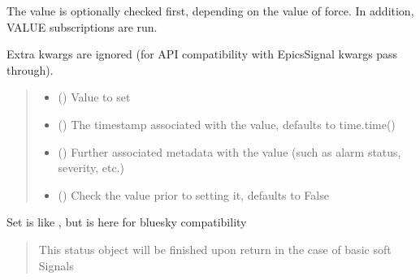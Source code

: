 \documentclass[letterpaper,10pt,english]{sphinxmanual}
\begin{document}
\begin{fulllineitems}
\begin{fulllineitems}
\sphinxAtStartPar
The value is optionally checked first, depending on the value of force.
In addition, VALUE subscriptions are run.

\sphinxAtStartPar
Extra kwargs are ignored (for API compatibility with EpicsSignal kwargs
pass through).
\begin{quote}\begin{description}
\begin{itemize}
\item {} 
\sphinxAtStartPar
{} () \textendash{} Value to set

\item {} 
\sphinxAtStartPar
{} (\sphinxstyleliteralemphasis{\sphinxupquote{, }}) \textendash{} The timestamp associated with the value, defaults to time.time()

\item {} 
\sphinxAtStartPar
{} (\sphinxstyleliteralemphasis{\sphinxupquote{, }}) \textendash{} Further associated metadata with the value (such as alarm status,
severity, etc.)

\item {} 
\sphinxAtStartPar
{} (\sphinxstyleliteralemphasis{\sphinxupquote{, }}) \textendash{} Check the value prior to setting it, defaults to False

\end{itemize}

\end{description}\end{quote}

\end{fulllineitems}


\begin{fulllineitems}
\label{\detokenize{API:raypyng_bluesky.detector.RaypyngDetector.set}}
\pysigstartsignatures
{}
\pysigstopsignatures
\sphinxAtStartPar
Set is like , but is here for bluesky compatibility
\begin{quote}\begin{description}
\sphinxAtStartPar
{} \textendash{} This status object will be finished upon return in the
case of basic soft Signals


\end{description}
\end{quote}
\end{fulllineitems}
\end{fulllineitems}
\end{document}
